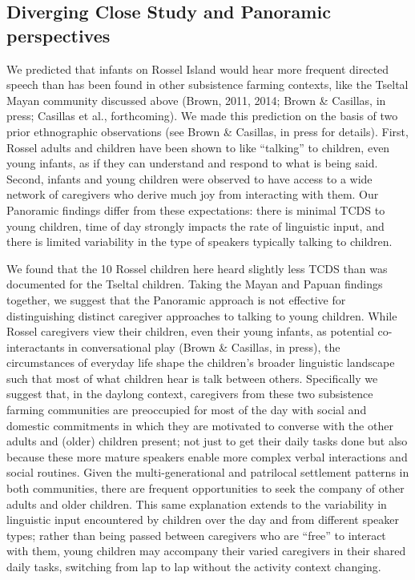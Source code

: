 \documentclass[,man,floatsintext]{apa6}
\begin{document}
\subsection{Diverging Close Study and Panoramic
perspectives}\label{diverging-close-study-and-panoramic-perspectives}

We predicted that infants on Rossel Island would hear more frequent
directed speech than has been found in other subsistence farming
contexts, like the Tseltal Mayan community discussed above (Brown, 2011,
2014; Brown \& Casillas, in press; Casillas et al., forthcoming). We
made this prediction on the basis of two prior ethnographic observations
(see Brown \& Casillas, in press for details). First, Rossel adults and
children have been shown to like \enquote{talking} to children, even
young infants, as if they can understand and respond to what is being
said. Second, infants and young children were observed to have access to
a wide network of caregivers who derive much joy from interacting with
them. Our Panoramic findings differ from these expectations: there is
minimal TCDS to young children, time of day strongly impacts the rate of
linguistic input, and there is limited variability in the type of
speakers typically talking to children.

We found that the 10 Rossel children here heard slightly less TCDS than
was documented for the Tseltal children. Taking the Mayan and Papuan
findings together, we suggest that the Panoramic approach is not
effective for distinguishing distinct caregiver approaches to talking to
young children. While Rossel caregivers view their children, even their
young infants, as potential co-interactants in conversational play
(Brown \& Casillas, in press), the circumstances of everyday life shape
the children's broader linguistic landscape such that most of what
children hear is talk between others. Specifically we suggest that, in
the daylong context, caregivers from these two subsistence farming
communities are preoccupied for most of the day with social and domestic
commitments in which they are motivated to converse with the other
adults and (older) children present; not just to get their daily tasks
done but also because these more mature speakers enable more complex
verbal interactions and social routines. Given the multi-generational
and patrilocal settlement patterns in both communities, there are
frequent opportunities to seek the company of other adults and older
children. This same explanation extends to the variability in linguistic
input encountered by children over the day and from different speaker
types; rather than being passed between caregivers who are
\enquote{free} to interact with them, young children may accompany their
varied caregivers in their shared daily tasks, switching from lap to lap
without the activity context changing.
\end{document}
